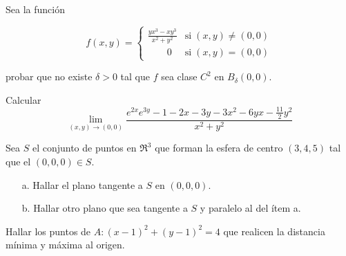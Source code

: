 
\begin{question}
    Sea la función

    \[
        f(x,y) =
        \begin{cases}
            \displaystyle \frac{yx^3-xy^3}{x^2+y^2} & \text{si}\; (x,y) \neq (0,0) \\[10pt]
            \qquad 0                                & \text{si}\; (x,y)=(0,0)
        \end{cases}
    \]

    probar que no existe $\delta>0$ tal que $f$ sea clase $C^2$ en $B_{\delta}(0,0)$.
\end{question}


\begin{question} Calcular
    \[
        \lim_{(x,y) \to (0,0)}
        \frac{e^{2x}e^{3y} - 1 - 2x -3y - 3x^2 - 6yx - \frac{11}{2}y^2}{x^2+y^2}
    \]
\end{question}


\begin{question}
    Sea $S$ el conjunto de puntos en  $\Re^{3}$  que forman la esfera de centro $(3,4,5)$ tal que el $(0,0,0) \in S$.
    \begin{itemize}
        \item [a.] Hallar el plano tangente a $S$ en $(0,0,0)$.
        \item [b.] Hallar otro plano que sea tangente a $S$ y paralelo al del ítem a.
    \end{itemize}
\end{question}


\begin{question}
    Hallar los puntos de $A:(x-1)^2 + (y-1)^2 = 4$ que realicen la distancia mínima y máxima al origen.
\end{question}

\newpage

